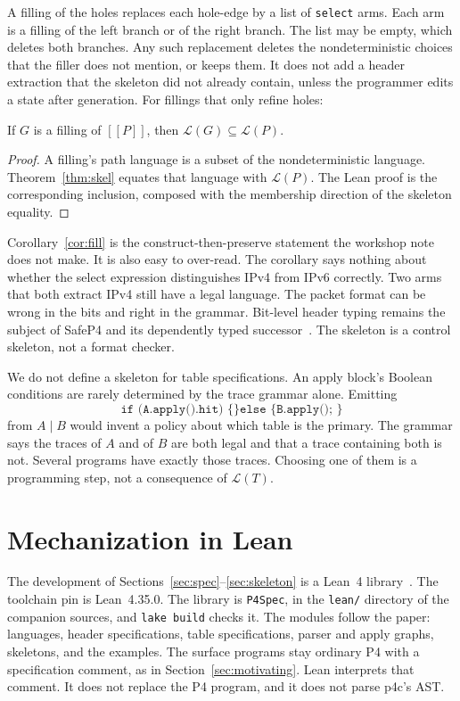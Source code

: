 \documentclass[a4paper,UKenglish,cleveref,autoref]{lipics-v2021}
\newcommand{\sem}[1]{[\![#1]\!]}
\begin{document}
A filling of the holes replaces each hole-edge by a list of \texttt{select} arms.
Each arm is a filling of the left branch or of the right branch.
The list may be empty, which deletes both branches.
Any such replacement deletes the nondeterministic choices that the filler does not mention, or keeps them.
It does not add a header extraction that the skeleton did not already contain, unless the programmer edits a state after generation.
For fillings that only refine holes:

\begin{corollary}
\label{cor:fill}
If \(G\) is a filling of \(\sem{P}\), then \(\mathcal{L}(G) \subseteq \mathcal{L}(P)\).
\end{corollary}

\begin{proof}
A filling's path language is a subset of the nondeterministic language.
Theorem~\ref{thm:skel} equates that language with \(\mathcal{L}(P)\).
The Lean proof is the corresponding inclusion, composed with the membership direction of the skeleton equality.
\end{proof}

Corollary~\ref{cor:fill} is the construct-then-preserve statement the workshop note does not make.
It is also easy to over-read.
The corollary says nothing about whether the select expression distinguishes IPv4 from IPv6 correctly.
Two arms that both extract IPv4 still have a legal language.
The packet format can be wrong in the bits and right in the grammar.
Bit-level header typing remains the subject of SafeP4 and its dependently typed successor~\cite{safep4,depp4}.
The skeleton is a control skeleton, not a format checker.

We do not define a skeleton for table specifications.
An apply block's Boolean conditions are rarely determined by the trace grammar alone.
Emitting
\[
  \texttt{if (A.apply().hit) \{\} else \{ B.apply(); \}}
\]
from \(A \mid B\) would invent a policy about which table is the primary.
The grammar says the traces of \(A\) and of \(B\) are both legal and that a trace containing both is not.
Several programs have exactly those traces.
Choosing one of them is a programming step, not a consequence of \(\mathcal{L}(T)\).

\section{Mechanization in Lean}
\label{sec:lean}

The development of Sections~\ref{sec:spec}--\ref{sec:skeleton} is a Lean~4 library~\cite{lean4}.
The toolchain pin is Lean~4.35.0.
The library is \texttt{P4Spec}, in the \texttt{lean/} directory of the companion sources, and \texttt{lake build} checks it.
The modules follow the paper: languages, header specifications, table specifications, parser and apply graphs, skeletons, and the examples.
The surface programs stay ordinary P4 with a specification comment, as in Section~\ref{sec:motivating}.
Lean interprets that comment.
It does not replace the P4 program, and it does not parse p4c's AST.
\end{document}
